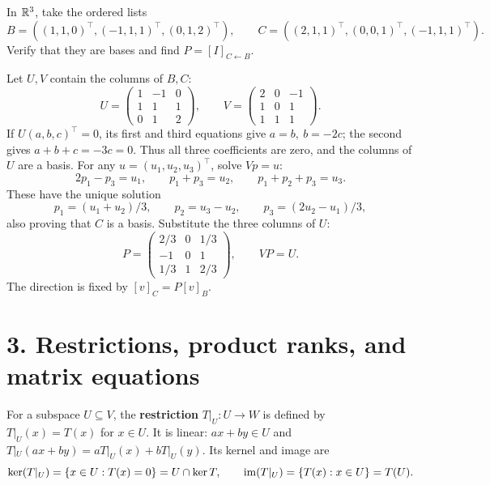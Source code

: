 \begin{example}\label{example:04:change}
In \(\mathbb R^3\), take the ordered lists
\[
B=((1,1,0)^\top,(-1,1,1)^\top,(0,1,2)^\top),\qquad
C=((2,1,1)^\top,(0,0,1)^\top,(-1,1,1)^\top).
\]
Verify that they are bases and find \(P=[I]_{C\leftarrow B}\).
\par\smallskip
{}
Let \(U,V\) contain the columns of \(B,C\):
\[
U=\begin{pmatrix}1&-1&0\\1&1&1\\0&1&2\end{pmatrix},
\qquad V=\begin{pmatrix}2&0&-1\\1&0&1\\1&1&1\end{pmatrix}.
\]
If \(U(a,b,c)^\top=0\), its first and third equations give \(a=b,\ b=-2c\);
the second gives \(a+b+c=-3c=0\). Thus all three coefficients are zero,
and the columns of \(U\) are a basis.
For any \(u=(u_1,u_2,u_3)^\top\), solve \(Vp=u\):
\[
2p_1-p_3=u_1,\qquad p_1+p_3=u_2,\qquad p_1+p_2+p_3=u_3.
\]
These have the unique solution
\[
p_1=(u_1+u_2)/3,\qquad p_2=u_3-u_2,\qquad
p_3=(2u_2-u_1)/3,
\]
also proving that \(C\) is a basis. Substitute the three columns of \(U\):
\[
P=\begin{pmatrix}2/3&0&1/3\\-1&0&1\\1/3&1&2/3\end{pmatrix},
\qquad VP=U.
\]
The direction is fixed by \([v]_C=P[v]_B\).
\end{example}

\section*{3. Restrictions, product ranks, and matrix equations}

For a subspace \(U\subseteq V\),
the \textbf{restriction} \(T|_U:U\to W\) is defined by
\(T|_U(x)=T(x)\) for \(x\in U\).
It is linear: \(ax+by\in U\) and
\(T|_U(ax+by)=aT|_U(x)+bT|_U(y)\).
Its kernel and image are
\[
\ker(T|_U)=\{x\in U:T(x)=0\}=U\cap\ker T,
\qquad \operatorname{im}(T|_U)=\{T(x):x\in U\}=T(U).
\]

